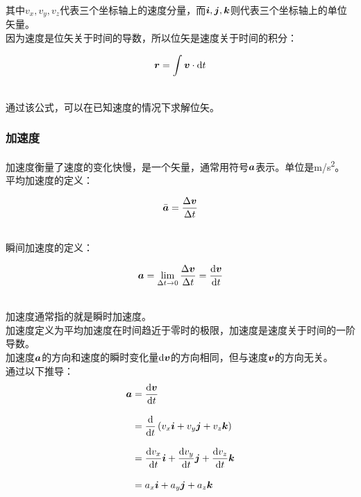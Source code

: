 \documentclass[UTF8]{ctexart}
\newcommand*{\veb}[1]{\vb*{#1}}
\newcommand*{\dif}{\mathop{}\!\mathrm{d}}
\begin{document}
    其中$v_x,v_y,v_z$代表三个坐标轴上的速度分量，而$\veb{i},\veb{j},\veb{k}$则代表三个坐标轴上的单位矢量。\\[6mm]
    因为速度是位矢关于时间的导数，所以位矢是速度关于时间的积分：\vspace{5pt}
    \begin{large}
        \begin{equation*}
            \veb{r}=\int \veb{v}\cdot\dif t
        \end{equation*}
    \end{large}\\
    通过该公式，可以在已知速度的情况下求解位矢。

\newpage

\subsubsection{加速度}
    加速度衡量了速度的变化快慢，是一个矢量，通常用符号$\veb{a}$表示。单位是\si{m/s^2}。\\[3mm]
    平均加速度的定义：
    \begin{large}
        \begin{equation*}
            \bar{\veb{a}}=\frac{\Delta \veb{v}}{\Delta t}
        \end{equation*}
    \end{large}\\
    瞬间加速度的定义：
    \begin{large}
        \begin{equation*}
            \veb{a}=\lim_{\Delta t\rightarrow 0}\frac{\Delta \veb{v}}{\Delta t}=\frac{\dif\veb{v}}{\dif t}
        \end{equation*}
    \end{large}\\
    加速度通常指的就是瞬时加速度。\\[3mm]
    加速度定义为平均加速度在时间趋近于零时的极限，加速度是速度关于时间的一阶导数。\\[3mm]
    加速度$\veb{a}$的方向和速度的瞬时变化量$\dif\veb{v}$的方向相同，但与速度$\veb{v}$的方向无关。\\[6mm]
    通过以下推导：
    \setcounter{equation}{0}
    \begin{align}
        \veb{a}
        &=\frac{\dif\veb{v}}{\dif t}\\[3mm]
        &=\frac{\dif}{\dif t}\left(v_x\veb{i}+v_y\veb{j}+v_z\veb{k}\right)\\[3mm]
        &=\frac{\dif v_x}{\dif t}\veb{i}+\frac{\dif v_y}{\dif t}\veb{j}+\frac{\dif v_z}{\dif t}\veb{k}\\[3mm]
        &=a_x\veb{i}+a_y\veb{j}+a_z\veb{k}
    \end{align}\\
\end{document}
